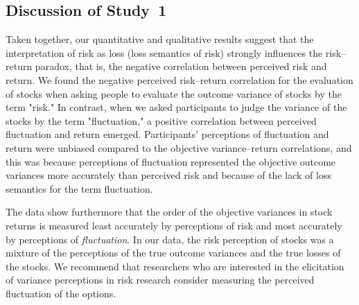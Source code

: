 \documentclass[a4paper,man, natbib,floatsintext]{apa6} %
\begin{document}
\subsection{Discussion of Study~1}
Taken together, our quantitative and qualitative results suggest that the interpretation of risk as loss (loss semantics of risk) strongly influences the risk--return paradox, that is, the negative correlation between perceived risk and return. We found the negative perceived risk--return correlation for the evaluation of stocks when asking people to evaluate the outcome variance of stocks by the term "risk." In contrast, when we asked participants to judge the variance of the stocks by the term "fluctuation," a positive correlation between perceived fluctuation and return emerged. Participants' perceptions of fluctuation and return were unbiased compared to the objective variance--return correlations, and this was because perceptions of fluctuation represented the objective outcome variances more accurately than perceived risk and because of the lack of loss semantics for the term fluctuation.


The data show furthermore that the order of the objective variances in stock returns is measured least accurately by perceptions of risk and most accurately by perceptions of \textit{fluctuation}. In our data, the risk perception of stocks was a mixture of the perceptions of the true outcome variances and the true losses of the stocks. We recommend that researchers who are interested in the elicitation of variance perceptions in risk research consider measuring the perceived fluctuation of the options.
\end{document}
